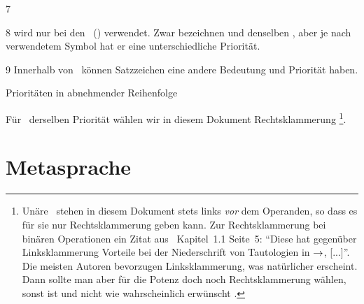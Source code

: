 \begin{table}[p]
\begin{center}
\begin{threeparttable}
\begin{tablenotes}
				\item[7] 
				\item[8] \chrqt{$\srand$} wird nur bei den \Schlussregeln\ () verwendet.
				Zwar bezeichnen \chrqt{$\metaandsym$} und \chrqt{$\srand$} denselben \Operator, aber je nach verwendetem Symbol hat er eine unterschiedliche Priorität.
				\item[9] Innerhalb von \Formeln\ können Satzzeichen eine andere Bedeutung und Priorität haben.
			\end{tablenotes}
		\end{threeparttable}
		\caption{Prioritäten in abnehmender Reihenfolge}
		\label{tab:Prioritäten}%
	\end{center}
\end{table}

Für \Operatoren\ derselben Priorität wählen wir in diesem Dokument Rechtsklammerung%
\footnote{%
	Unäre \Operatoren\ stehen in diesem Dokument stets links \emph{vor} dem Operanden, so dass es für sie nur Rechtsklammerung geben kann.
	Zur Rechtsklammerung bei binären Operationen ein Zitat aus~\cite{bib:Rautenberg} Kapitel~1.1 Seite~5:
	\enquote{Diese hat gegenüber Linksklammerung Vorteile bei der Niederschrift von Tautologien in $\rightarrow$, [...]}.
	Die meisten Autoren bevorzugen Linksklammerung, was natürlicher erscheint.
	Dann sollte man aber für die Potenz doch noch Rechtsklammerung wählen, sonst ist  und nicht wie wahrscheinlich erwünscht .
}.

\section{Metasprache}%
\label{sec:Metasprache}

